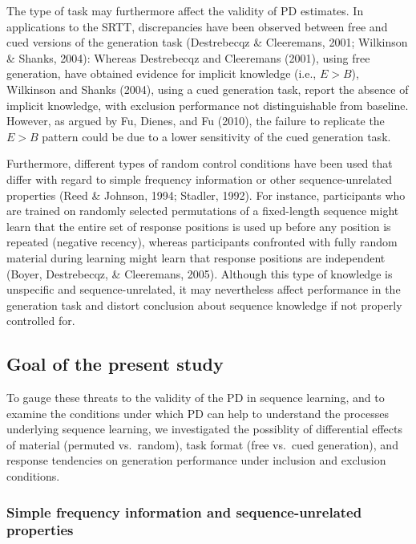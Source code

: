 \documentclass[
  english,
  man]{apa6}
\begin{document}
The type of task may furthermore affect the validity of PD estimates.
In applications to the SRTT, discrepancies have been observed between free and cued versions of the generation task (Destrebecqz \& Cleeremans, 2001; Wilkinson \& Shanks, 2004):
Whereas Destrebecqz and Cleeremans (2001), using free generation, have obtained evidence for implicit knowledge (i.e., \(E>B\)), Wilkinson and Shanks (2004), using a cued generation task, report the absence of implicit knowledge, with exclusion performance not distinguishable from baseline.
However, as argued by Fu, Dienes, and Fu (2010), the failure to replicate the \(E>B\) pattern could be due to a lower sensitivity of the cued generation task.

Furthermore, different types of random control conditions have been used that differ with regard to simple frequency information or other sequence-unrelated properties (Reed \& Johnson, 1994; Stadler, 1992).
For instance, participants who are trained on randomly selected permutations of a fixed-length sequence might learn that the entire set of response positions is used up before any position is repeated (negative recency), whereas participants confronted with fully random material during learning might learn that response positions are independent (Boyer, Destrebecqz, \& Cleeremans, 2005).
Although this type of knowledge is unspecific and sequence-unrelated, it may nevertheless affect performance in the generation task and distort conclusion about sequence knowledge if not properly controlled for.

\hypertarget{goal-of-the-present-study}{%
\subsection{Goal of the present study}\label{goal-of-the-present-study}}

To gauge these threats to the validity of the PD in sequence learning, and to examine the conditions under which PD can help to understand the processes underlying sequence learning, we investigated the possiblity of differential effects of material (permuted vs.~random), task format (free vs.~cued generation), and response tendencies on generation performance under inclusion and exclusion conditions.

\hypertarget{simple-frequency-information-and-sequence-unrelated-properties}{%
\subsubsection{Simple frequency information and sequence-unrelated properties}\label{simple-frequency-information-and-sequence-unrelated-properties}}
\end{document}
